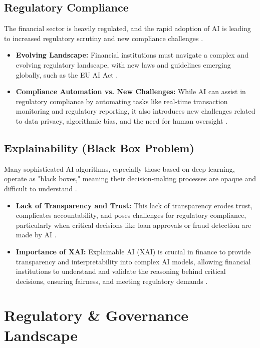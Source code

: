 \subsection{Regulatory Compliance}
The financial sector is heavily regulated, and the rapid adoption of AI is leading to increased regulatory scrutiny and new compliance challenges \cite{GrantThornton_Regulatory, ThomsonReuters_Regulatory}.
\begin{itemize}
    \item \textbf{Evolving Landscape:} Financial institutions must navigate a complex and evolving regulatory landscape, with new laws and guidelines emerging globally, such as the EU AI Act \cite{ThomsonReuters_Regulatory}.
    \item \textbf{Compliance Automation vs. New Challenges:} While AI can assist in regulatory compliance by automating tasks like real-time transaction monitoring and regulatory reporting, it also introduces new challenges related to data privacy, algorithmic bias, and the need for human oversight \cite{MeshAI_Regulatory, MCGComply_Regulatory}.
\end{itemize}

\subsection{Explainability (Black Box Problem)}
Many sophisticated AI algorithms, especially those based on deep learning, operate as "black boxes," meaning their decision-making processes are opaque and difficult to understand \cite{Lumenova_Explainability, CorporateFinanceInstitute_Explainability}.
\begin{itemize}
    \item \textbf{Lack of Transparency and Trust:} This lack of transparency erodes trust, complicates accountability, and poses challenges for regulatory compliance, particularly when critical decisions like loan approvals or fraud detection are made by AI \cite{CFAInstitute_Explainability}.
    \item \textbf{Importance of XAI:} Explainable AI (XAI) is crucial in finance to provide transparency and interpretability into complex AI models, allowing financial institutions to understand and validate the reasoning behind critical decisions, ensuring fairness, and meeting regulatory demands \cite{Synechron_Explainability}.
\end{itemize}

\section{Regulatory \& Governance Landscape}


